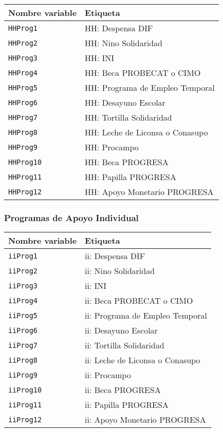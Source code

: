 \documentclass[
]{article}
\begin{document}
\begin{longtable}[]{@{}ll@{}}
\toprule\noalign{}
\textbf{Nombre variable} & \textbf{Etiqueta} \\
\midrule\noalign{}
\endhead
\bottomrule\noalign{}
\endlastfoot
\texttt{HHProg1} & HH: Despensa DIF \\
\texttt{HHProg2} & HH: Nino Solidaridad \\
\texttt{HHProg3} & HH: INI \\
\texttt{HHProg4} & HH: Beca PROBECAT o CIMO \\
\texttt{HHProg5} & HH: Programa de Empleo Temporal \\
\texttt{HHProg6} & HH: Desayuno Escolar \\
\texttt{HHProg7} & HH: Tortilla Solidaridad \\
\texttt{HHProg8} & HH: Leche de Liconsa o Conasupo \\
\texttt{HHProg9} & HH: Procampo \\
\texttt{HHProg10} & HH: Beca PROGRESA \\
\texttt{HHProg11} & HH: Papilla PROGRESA \\
\texttt{HHProg12} & HH: Apoyo Monetario PROGRESA \\
\end{longtable}

\subsubsection{Programas de Apoyo
Individual}\label{programas-de-apoyo-individual}

\begin{longtable}[]{@{}ll@{}}
\toprule\noalign{}
\textbf{Nombre variable} & \textbf{Etiqueta} \\
\midrule\noalign{}
\endhead
\bottomrule\noalign{}
\endlastfoot
\texttt{iiProg1} & ii: Despensa DIF \\
\texttt{iiProg2} & ii: Nino Solidaridad \\
\texttt{iiProg3} & ii: INI \\
\texttt{iiProg4} & ii: Beca PROBECAT o CIMO \\
\texttt{iiProg5} & ii: Programa de Empleo Temporal \\
\texttt{iiProg6} & ii: Desayuno Escolar \\
\texttt{iiProg7} & ii: Tortilla Solidaridad \\
\texttt{iiProg8} & ii: Leche de Liconsa o Conasupo \\
\texttt{iiProg9} & ii: Procampo \\
\texttt{iiProg10} & ii: Beca PROGRESA \\
\texttt{iiProg11} & ii: Papilla PROGRESA \\
\texttt{iiProg12} & ii: Apoyo Monetario PROGRESA \\
\end{longtable}
\end{document}
